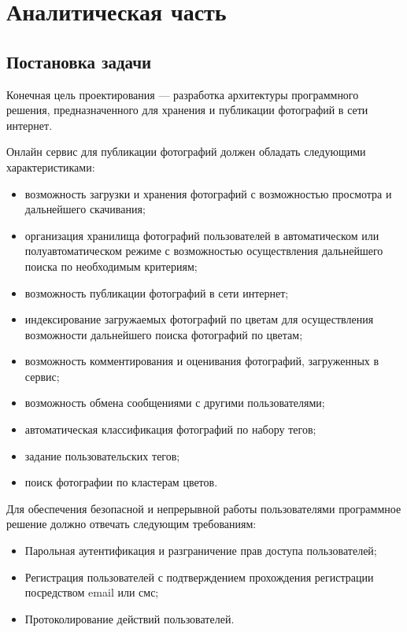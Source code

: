 \section{Аналитическая часть}\label{analytics}

\subsection{Постановка задачи}\label{problem-formulation}

Конечная цель проектирования --- разработка архитектуры программного решения, предназначенного для хранения и публикации фотографий в сети интернет.

Онлайн сервис для публикации фотографий должен обладать следующими характеристиками:
\begin{itemize}
    \item возможность загрузки и хранения фотографий с возможностью просмотра и дальнейшего скачивания;
    \item организация хранилища фотографий пользователей в автоматическом или полуавтоматическом режиме с возможностью осуществления дальнейшего поиска по необходимым критериям;
    \item возможность публикации фотографий в сети интернет;
    \item индексирование загружаемых фотографий по цветам для осуществления возможности дальнейшего поиска фотографий по цветам;
    \item возможность комментирования и оценивания фотографий, загруженных в сервис;
    \item возможность обмена сообщениями с другими пользователями;
    \item автоматическая классификация фотографий по набору тегов;
    \item задание пользовательских тегов;
    \item поиск фотографии по кластерам цветов.
\end{itemize}

Для обеспечения безопасной и непрерывной работы пользователями программное решение должно отвечать следующим требованиям:
\begin{itemize}
    \item Парольная аутентификация и разграничение прав доступа пользователей;
    \item Регистрация пользователей с подтверждением прохождения регистрации посредством email или смс;
    \item Протоколирование действий пользователей.
\end{itemize}

